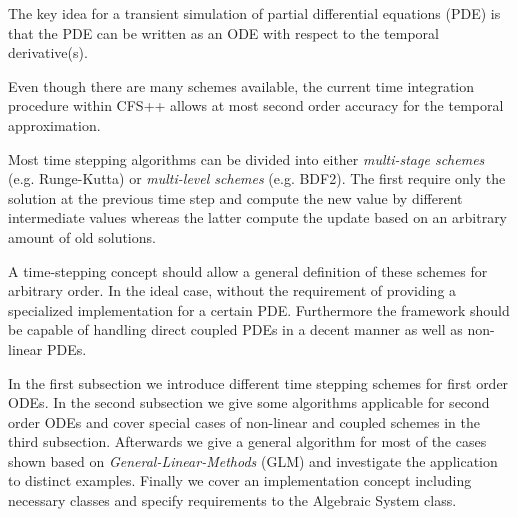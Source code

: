 The key idea for a transient simulation of partial differential equations (PDE) is that the PDE can
be written as an ODE with respect to the temporal derivative(s). 

Even though there are many schemes available, the current time integration procedure within CFS++
allows at most second order accuracy for the temporal approximation. 

Most time stepping algorithms can be divided into either {\it multi-stage schemes} (e.g.
Runge-Kutta) or {\it multi-level schemes} (e.g. BDF2). The first require only
the solution at the previous time step and compute the new value by different intermediate values
whereas the latter compute the update based on an arbitrary amount of old solutions.

A time-stepping concept should allow a general definition of these schemes for arbitrary order. 
In the ideal case, without the requirement of providing a specialized implementation for a certain PDE. 
Furthermore the framework should be capable of handling direct coupled PDEs in a decent manner as
well as non-linear PDEs.

In the first subsection we introduce different time stepping schemes for first order ODEs. In the
second subsection we give some algorithms applicable for second order ODEs and cover special cases of
non-linear and coupled schemes in the third subsection.
Afterwards we give a general algorithm for most of the cases shown based on {\it
General-Linear-Methods} (GLM) and investigate the application to distinct examples.
Finally we cover an implementation concept including necessary classes and specify requirements to 
the Algebraic System class.
